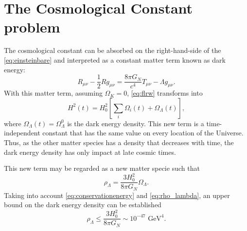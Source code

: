 \section{The Cosmological Constant problem}
The cosmological constant can be absorbed on the right-hand-side of the \autoref{eq:einsteinbare} and interpreted as a constant matter term known as dark energy:
\begin{equation}
R_{\mu\nu}-\frac{1}{2}Rg_{\mu\nu} = \frac{8\pi G_N}{c^4}T_{\mu\nu}-\Lambda g_{\mu\nu}.
\end{equation}
With this matter term, assuming $\Omega_K=0$, \autoref{eq:flrw} transforms into
\begin{equation}
H^2(t) = H_0^2\left[\sum_i\Omega_i(t) +\Omega_\Lambda(t)\right],
\end{equation}
where $\Omega_\Lambda(t)=\Omega_\Lambda^0$ is the dark energy density. This new term is a time-independent constant that has the same value on every location of the Universe. Thus, as the other matter species has a density that decreases with time, the dark energy density has only impact at late cosmic times.
\newline

This new term may be regarded as a new matter specie such that
\begin{equation}
\rho_\Lambda = \frac{3H_0^2}{8\pi G_N}\Omega_\Lambda.
\label{eq:rho_lambda}
\end{equation}
Taking into account \autoref{eq:conservationenergy} and \autoref{eq:rho_lambda}, an upper bound on the dark energy density can be established
\begin{equation}
\rho_\Lambda \leq \frac{3H_0^2}{8\pi G_N} \sim 10 ^{-47} \mbox{ GeV}^4.
\label{eq:cosmologicalconstant}
\end{equation}
\newline

